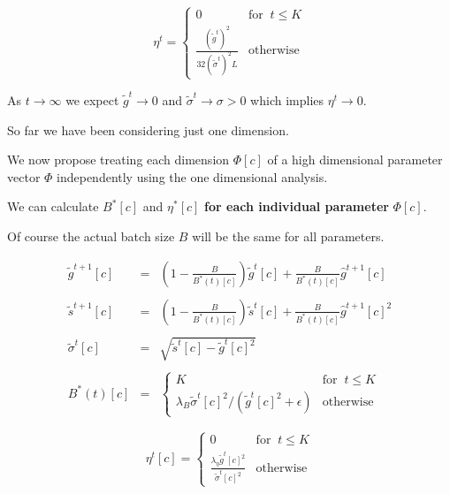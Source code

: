 {

$$\eta^t = \left\{\begin{array}{ll} 0 & \mbox{for}\;\;t \leq K \\ \frac{(\tilde{g}^t)^2}{32(\tilde{\sigma}^t)^2L} & \mbox{otherwise}
\end{array}\right.$$

\vfill
As $t \rightarrow \infty$ we expect $\tilde{g}^t \rightarrow 0$ and $\tilde{\sigma}^t \rightarrow \sigma > 0$ which implies
$\eta^t \rightarrow 0$.


So far we have been considering just one dimension.

\vfill
We now propose treating each dimension $\Phi[c]$ of a high dimensional parameter vector $\Phi$ independently using the one dimensional analysis.

\vfill
We can calculate $B^*[c]$ and $\eta^*[c]$ {\bf for each individual parameter} $\Phi[c]$.

\vfill
Of course the actual batch size $B$ will be the same for all parameters.

\begin{eqnarray*}
  \tilde{g}^{t+1}[c] & = & \left(1-\frac{B}{B^*(t)[c]}\right)\tilde{g}^t[c] + \frac{B}{B^*(t)[c]} \hat{g}^{t+1}[c] \\
  \\
  \tilde{s}^{t+1}[c] & = & \left(1-\frac{B}{B^*(t)[c]}\right)\tilde{s}^t[c] + \frac{B}{B^*(t)[c]} \hat{g}^{t+1}[c]^2 \\
  \\
  \tilde{\sigma}^t[c] & = & \sqrt{\tilde{s}^t[c] - \tilde{g}^t[c]^2} \\
  \\
  B^*(t)[c] &= & \left\{\begin{array}{ll} K & \mbox{for}\;\; t \leq K \\
  \lambda_B\tilde{\sigma}^t[c]^2/(\tilde{g}^t[c]^2 + \epsilon) & \mbox{otherwise} \end{array}\right.
\end{eqnarray*}


$$\eta^t[c] = \left\{\begin{array}{ll} 0 & \mbox{for}\;\;t \leq K \\
        \frac{\lambda_\eta\tilde{g}^t[c]^2}{\tilde{\sigma}^t[c]^2} & \mbox{otherwise}
\end{array}\right.$$

}
